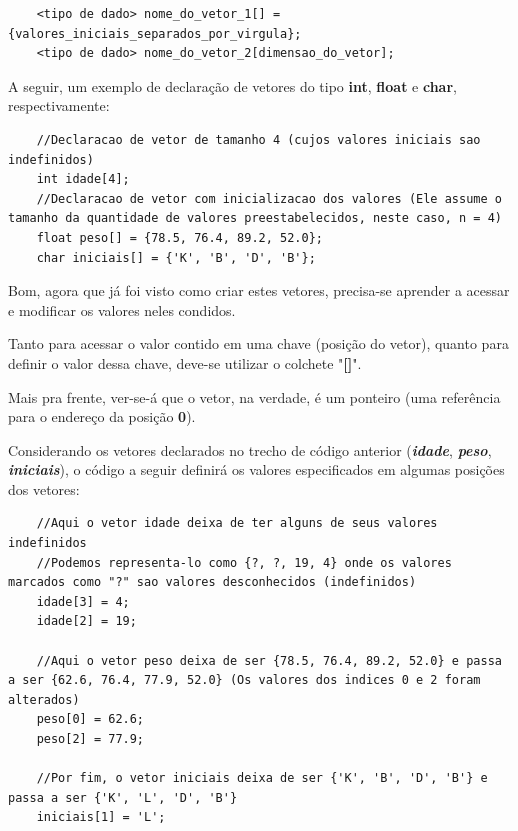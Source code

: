 \documentclass[12pt]{article}
\newcommand\tab[1][1cm]{\hspace*{#1}}
\begin{document}
\hspace{0.25cm}
\begin{lstlisting}
    <tipo de dado> nome_do_vetor_1[] = {valores_iniciais_separados_por_virgula};
    <tipo de dado> nome_do_vetor_2[dimensao_do_vetor];
\end{lstlisting}

\hspace{0.25cm}
\par\tab A seguir, um exemplo de declaração de vetores do tipo \textbf{int}, \textbf{float} e \textbf{char}, respectivamente:

\hspace{0.25cm}
\begin{lstlisting}
    //Declaracao de vetor de tamanho 4 (cujos valores iniciais sao indefinidos)
    int idade[4];
    //Declaracao de vetor com inicializacao dos valores (Ele assume o tamanho da quantidade de valores preestabelecidos, neste caso, n = 4)
    float peso[] = {78.5, 76.4, 89.2, 52.0};
    char iniciais[] = {'K', 'B', 'D', 'B'};
\end{lstlisting}

\par\tab Bom, agora que já foi visto como criar estes vetores, precisa-se aprender a acessar e modificar os valores neles condidos.

\par\tab Tanto para acessar o valor contido em uma chave (posição do vetor), quanto para definir o valor dessa chave, deve-se utilizar o colchete "\textbf{[]}".

\hspace{0.25cm}
\begin{tcolorbox}[colback=blue!5!white,colframe=blue!75!black,title=Dica!]
  \par\tab Mais pra frente, ver-se-á que o vetor, na verdade, é um ponteiro (uma referência para o endereço da posição \textbf{0}).
\end{tcolorbox}

\par\tab Considerando os vetores declarados no trecho de código anterior (\textbf{\textit{idade}}, \textbf{\textit{peso}}, \textbf{\textit{iniciais}}), o código a seguir definirá os valores especificados em algumas posições dos vetores:

\hspace{0.25cm}
\begin{lstlisting}
    //Aqui o vetor idade deixa de ter alguns de seus valores indefinidos
    //Podemos representa-lo como {?, ?, 19, 4} onde os valores marcados como "?" sao valores desconhecidos (indefinidos)
    idade[3] = 4;
    idade[2] = 19;
    
    //Aqui o vetor peso deixa de ser {78.5, 76.4, 89.2, 52.0} e passa a ser {62.6, 76.4, 77.9, 52.0} (Os valores dos indices 0 e 2 foram alterados)
    peso[0] = 62.6;
    peso[2] = 77.9;
    
    //Por fim, o vetor iniciais deixa de ser {'K', 'B', 'D', 'B'} e passa a ser {'K', 'L', 'D', 'B'}
    iniciais[1] = 'L';
\end{lstlisting}
\end{document}
